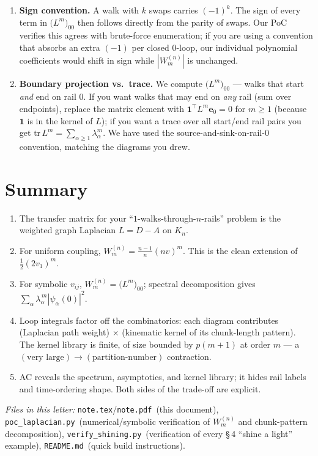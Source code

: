 \documentclass[11pt,a4paper]{article}
\begin{document}
\begin{enumerate}[leftmargin=2em,itemsep=4pt]
  \item \textbf{Sign convention.} A walk with $k$ swaps carries
        $(-1)^k$. The sign of every term in $\big(L^m\big)_{00}$ then
        follows directly from the parity of swaps. Our PoC verifies this
        agrees with brute-force enumeration; if you are using a convention
        that absorbs an extra $(-1)$ per closed $0$-loop, our individual
        polynomial coefficients would shift in sign while
        $|W^{(n)}_m|$ is unchanged.

  \item \textbf{Boundary projection vs.\ trace.} We compute
        $\big(L^m\big)_{00}$ --- walks that start \emph{and} end on rail
        $0$. If you want walks that may end on \emph{any} rail (sum over
        endpoints), replace the matrix element with
        $\mathbf 1^{\top}L^m\mathbf{e}_0 = 0$ for $m{\ge}1$
        (because $\mathbf 1$ is in the kernel of $L$); if you want a trace
        over all start/end rail pairs you get
        $\mathrm{tr}\,L^m = \sum_{\alpha\geq 1}\lambda_\alpha^{m}$.
        We have used the source-and-sink-on-rail-$0$ convention, matching
        the diagrams you drew.
\end{enumerate}

\section{Summary}

\begin{enumerate}[leftmargin=2em,itemsep=4pt]
  \item The transfer matrix for your ``$1$-walks-through-$n$-rails'' problem
        is the weighted graph Laplacian $L=D-A$ on $K_n$.
  \item For uniform coupling, $W^{(n)}_m=\frac{n-1}{n}(nv)^m$. This is the
        clean extension of $\frac12(2v_1)^m$.
  \item For symbolic $v_{ij}$, $W^{(n)}_m=\big(L^{m}\big)_{00}$; spectral
        decomposition gives $\sum_\alpha\lambda_\alpha^{\,m}|\psi_\alpha(0)|^{2}$.
  \item Loop integrals factor off the combinatorics: each diagram
        contributes (Laplacian path weight) $\times$ (kinematic kernel of
        its chunk-length pattern). The kernel library is finite, of size
        bounded by $p(m{+}1)$ at order $m$ --- a
        $(\text{very large})\to(\text{partition-number})$ contraction.
  \item AC reveals the spectrum, asymptotics, and kernel library; it hides
        rail labels and time-ordering shape. Both sides of the trade-off are
        explicit.
\end{enumerate}

\noindent\emph{Files in this letter:}
\texttt{note.tex}/\texttt{note.pdf}~(this document),
\texttt{poc\_laplacian.py}~(numerical/symbolic verification of
$W^{(n)}_m$ and chunk-pattern decomposition),
\texttt{verify\_shining.py}~(verification of every \S\,4 ``shine a
light'' example),
\texttt{README.md}~(quick build instructions).
\end{document}
